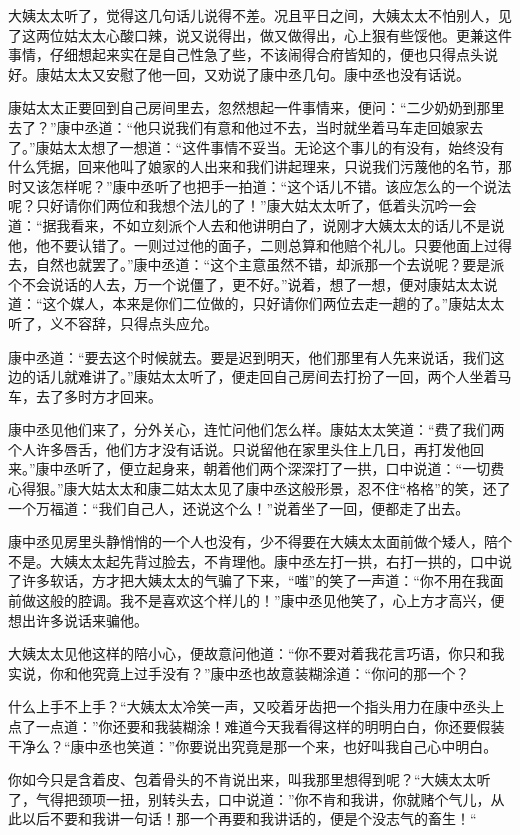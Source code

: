 \documentclass[12pt,UTF8]{ctexbook}
\begin{document}
{{{大姨太太听了，觉得这几句话儿说得不差。况且平日之间，大姨太太不怕别人，见了这两位姑太太心酸口辣，说又说得出，做又做得出，心上狠有些馁他。更兼这件事情，仔细想起来实在是自己性急了些，不该闹得合府皆知的，便也只得点头说好。康姑太太又安慰了他一回，又劝说了康中丞几句。康中丞也没有话说。

康姑太太正要回到自己房间里去，忽然想起一件事情来，便问：“二少奶奶到那里去了？”康中丞道：“他只说我们有意和他过不去，当时就坐着马车走回娘家去了。”康姑太太想了一想道：“这件事情不妥当。无论这个事儿的有没有，始终没有什么凭据，回来他叫了娘家的人出来和我们讲起理来，只说我们污蔑他的名节，那时又该怎样呢？”康中丞听了也把手一拍道：“这个话儿不错。该应怎么的一个说法呢？只好请你们两位和我想个法儿的了！”康大姑太太听了，低着头沉吟一会道：“据我看来，不如立刻派个人去和他讲明白了，说刚才大姨太太的话儿不是说他，他不要认错了。一则过过他的面子，二则总算和他赔个礼儿。只要他面上过得去，自然也就罢了。”康中丞道：“这个主意虽然不错，却派那一个去说呢？要是派个不会说话的人去，万一个说僵了，更不好。”说着，想了一想，便对康姑太太说道：“这个媒人，本来是你们二位做的，只好请你们两位去走一趟的了。”康姑太太听了，义不容辞，只得点头应允。

康中丞道：“要去这个时候就去。要是迟到明天，他们那里有人先来说话，我们这边的话儿就难讲了。”康姑太太听了，便走回自己房间去打扮了一回，两个人坐着马车，去了多时方才回来。

康中丞见他们来了，分外关心，连忙问他们怎么样。康姑太太笑道：“费了我们两个人许多唇舌，他们方才没有话说。只说留他在家里头住上几日，再打发他回来。”康中丞听了，便立起身来，朝着他们两个深深打了一拱，口中说道：“一切费心得狠。”康大姑太太和康二姑太太见了康中丞这般形景，忍不住“格格”的笑，还了一个万福道：“我们自己人，还说这个么！”说着坐了一回，便都走了出去。

康中丞见房里头静悄悄的一个人也没有，少不得要在大姨太太面前做个矮人，陪个不是。大姨太太起先背过脸去，不肯理他。康中丞左打一拱，右打一拱的，口中说了许多软话，方才把大姨太太的气骗了下来，“嗤”的笑了一声道：“你不用在我面前做这般的腔调。我不是喜欢这个样儿的！”康中丞见他笑了，心上方才高兴，便想出许多说话来骗他。

大姨太太见他这样的陪小心，便故意问他道：“你不要对着我花言巧语，你只和我实说，你和他究竟上过手没有？”康中丞也故意装糊涂道：“你问的那一个？

什么上手不上手？“大姨太太冷笑一声，又咬着牙齿把一个指头用力在康中丞头上点了一点道：”你还要和我装糊涂！难道今天我看得这样的明明白白，你还要假装干净么？“康中丞也笑道：”你要说出究竟是那一个来，也好叫我自己心中明白。

你如今只是含着皮、包着骨头的不肯说出来，叫我那里想得到呢？“大姨太太听了，气得把颈项一扭，别转头去，口中说道：”你不肯和我讲，你就赌个气儿，从此以后不要和我讲一句话！那一个再要和我讲话的，便是个没志气的畜生！“

}}}
\end{document}
